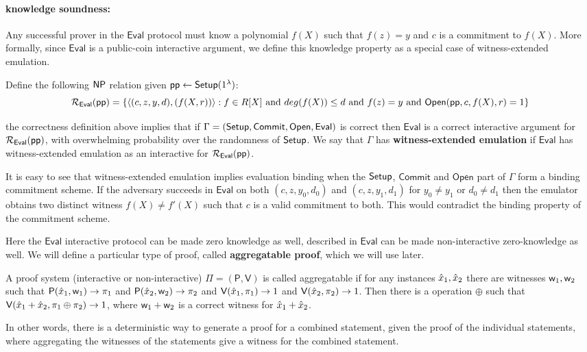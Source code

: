 \documentclass[runningheads]{llncs}
\def\commit{\mathsf{Commit}}
\def\open{\mathsf{Open}}
\def\eval{\mathsf{Eval}}
\def\pp{\mathsf{pp}}
\def\prover{\mathsf{P}}
\def\verifier{\mathsf{V}}
\begin{document}
\paragraph{\textbf{knowledge soundness: }} Any successful prover in the $\eval$ protocol must know a polynomial $f(X)$ such that $f(z)=y$ and $c$ is a commitment to $f(X)$. More formally, since $\eval$ is a public-coin interactive argument, we define this knowledge property as a special case of witness-extended emulation.

Define the following $\mathsf{NP}$ relation given $\pp\leftarrow \setup(\secparam)$:
$$\calR_{\eval}(\pp)=\{\innp{(c,z,y,d)}{(f(X,r))}: f\in R[X] \text{ and } deg(f(X))\leq d\\
\text{ and } f(z)=y \text{ and }\open(\pp,c,f(X),r) =1 \}$$

the correctness definition above implies that if $\Gamma = (\setup, \commit, \open, \eval)$ is correct then $\eval$ is a correct interactive argument for $\calR_{\eval}(\pp)$, with overwhelming probability over the randomness of $\mathsf{Setup}$. We say that $\Gamma$ has \textbf{witness-extended emulation} if $\eval$ has witness-extended emulation as an interactive for $\calR_{\eval}(\pp)$.

It is easy to see that witness-extended emulation implies evaluation binding when the $\mathsf{Setup}$, $\commit$ and $\open$ part of $\Gamma$ form a binding commitment scheme. If the adversary succeeds in $\eval$ on both $(c,z, y_0,d_0)$ and $(c,z,y_1,d_1)$ for $y_0\neq y_1$ or $d_0\neq d_1$ then the emulator obtains two distinct witness $f(X)\neq f'(X)$ such that $c$ is a valid commitment to both. This would contradict the binding property of the commitment scheme.

Here the $\eval$ interactive protocol can be made zero knowledge as well, described in \cite{DARK19}
$\eval$ can be made non-interactive zero-knowledge as well.
We will define a particular type of proof, called \textbf{aggregatable proof}, which we will use later.

\begin{definition}\label{defn:aggregatable}
	A proof system (interactive or non-interactive) $\Pi=(\prover, \verifier)$ is called aggregatable if for any instances $\hat{x}_1, \hat{x}_2$ there are witnesses $\mathsf{w}_1, \mathsf{w}_2$ such that $\prover(\stmt_1,\wit_1) \rightarrow \pi_1$ and $\prover(\stmt_2, \wit_2) \rightarrow \pi_2$ and $\verifier(\stmt_1,\pi_1) \rightarrow 1$ and $\verifier(\stmt_2,\pi_2) \rightarrow 1$. Then there is a operation $\oplus$ such that $\verifier(\stmt_1+\stmt_2, \pi_1 \oplus \pi_2) \rightarrow 1$, where $\mathsf{w}_1 + \mathsf{w}_2$ is a correct witness for $\hat{x}_1+\hat{x}_2$.
\end{definition}
In other words, there is a deterministic way to generate a proof for a combined statement, given the proof of the individual statements, where aggregating the witnesses of the statements give a witness for the combined statement.
\end{document}
